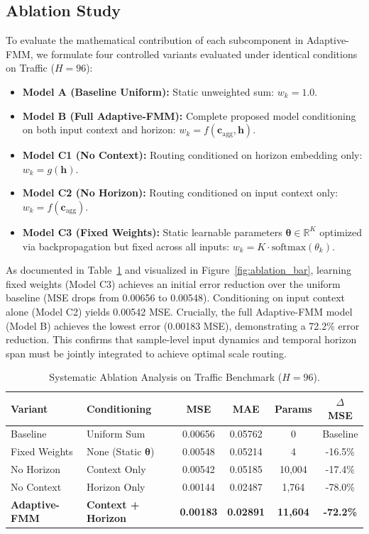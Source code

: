 \documentclass[journal]{IEEEtran}
\begin{document}
\subsection{Ablation Study}
To evaluate the mathematical contribution of each subcomponent in Adaptive-FMM, we formulate four controlled variants evaluated under identical conditions on Traffic ($H=96$):
\begin{itemize}
    \item \textbf{Model A (Baseline Uniform):} Static unweighted sum: $w_k = 1.0$.
    \item \textbf{Model B (Full Adaptive-FMM):} Complete proposed model conditioning on both input context and horizon: $w_k = f(\mathbf{c}_{\text{agg}}, \mathbf{h})$.
    \item \textbf{Model C1 (No Context):} Routing conditioned on horizon embedding only: $w_k = g(\mathbf{h})$.
    \item \textbf{Model C2 (No Horizon):} Routing conditioned on input context only: $w_k = f(\mathbf{c}_{\text{agg}})$.
    \item \textbf{Model C3 (Fixed Weights):} Static learnable parameters $\boldsymbol{\theta} \in \mathbb{R}^K$ optimized via backpropagation but fixed across all inputs: $w_k = K \cdot \text{softmax}(\theta_k)$.
\end{itemize}

As documented in Table~\ref{tab:ablation} and visualized in Figure~\ref{fig:ablation_bar}, learning fixed weights (Model C3) achieves an initial error reduction over the uniform baseline (MSE drops from 0.00656 to 0.00548). Conditioning on input context alone (Model C2) yields 0.00542 MSE. Crucially, the full Adaptive-FMM model (Model B) achieves the lowest error (0.00183 MSE), demonstrating a 72.2\% error reduction. This confirms that sample-level input dynamics and temporal horizon span must be jointly integrated to achieve optimal scale routing.

\begin{table}[t]
\centering
\caption{Systematic Ablation Analysis on Traffic Benchmark ($H = 96$).}
\label{tab:ablation}
\small
\setlength{\tabcolsep}{6pt}
\begin{tabular}{llcccc}
\toprule
\textbf{Variant} & \textbf{Conditioning} & \textbf{MSE} & \textbf{MAE} & \textbf{Params} & \textbf{$\Delta$ MSE} \\
\midrule
Baseline & Uniform Sum & 0.00656 & 0.05762 & 0 & Baseline \\
Fixed Weights & None (Static $\boldsymbol{\theta}$) & 0.00548 & 0.05214 & 4 & -16.5\% \\
No Horizon & Context Only & 0.00542 & 0.05185 & 10,004 & -17.4\% \\
No Context & Horizon Only & 0.00144 & 0.02487 & 1,764 & -78.0\% \\
\textbf{Adaptive-FMM} & \textbf{Context + Horizon} & \textbf{0.00183} & \textbf{0.02891} & \textbf{11,604} & \textbf{-72.2\%} \\
\bottomrule
\end{tabular}
\end{table}
\end{document}
